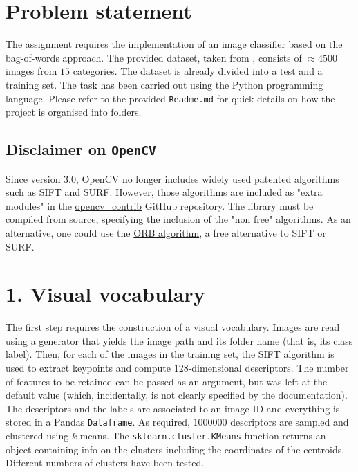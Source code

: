 \documentclass[12pt]{article}
\begin{document}
	
	\maketitle

  \section*{Problem statement}

  The assignment requires the implementation of an image classifier based on the bag-of-words approach. The provided dataset, taken from \cite{lazebnik2006beyond}, consists of \( \approx 4500 \) images from \( 15 \) categories. The dataset is already divided into a test and a training set. The task has been carried out using the Python programming language. Please refer to the provided \texttt{Readme.md} for quick details on how the project is organised into folders.


  \subsection*{Disclaimer on \texttt{OpenCV}}

  Since version 3.0, OpenCV no longer includes widely used patented algorithms such as SIFT and SURF. However, those algorithms are included as "extra modules" in the \href{https://github.com/opencv/opencv_contrib}{opencv\_contrib} GitHub repository. The library must be compiled from source, specifying the inclusion of the "non free" algorithms. As an alternative, one could use the \href{https://opencv-python-tutroals.readthedocs.io/en/latest/py_tutorials/py_feature2d/py_orb/py_orb.html}{ORB algorithm}, a free alternative to SIFT or SURF.



  \section*{1. Visual vocabulary}
  
  The first step requires the construction of a visual vocabulary. Images are read using a generator that yields the image path and its folder name (that is, its class label). Then, for each of the images in the training set, the SIFT algorithm is used to extract keypoints and compute \( 128 \)-dimensional descriptors. The number of features to be retained can be passed as an argument, but was left at the default value (which, incidentally, is not clearly specified by the documentation). The descriptors and the labels are associated to an image ID and everything is stored in a Pandas \texttt{Dataframe}. As required, \( 1000000 \) descriptors are sampled and clustered using \( k \)-means. The \texttt{sklearn.cluster.KMeans} function returns an object containing info on the clusters including the coordinates of the centroids. Different numbers of clusters have been tested.
  
\end{document}
